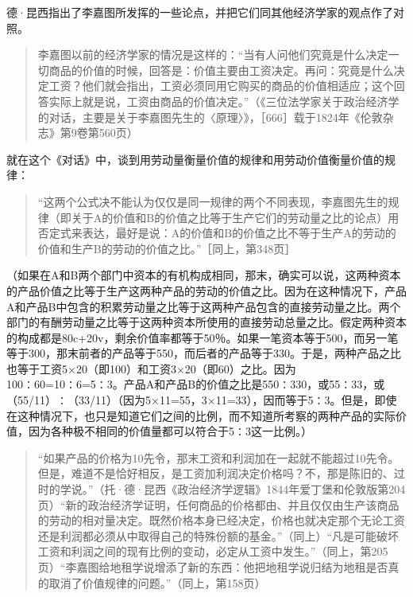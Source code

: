 
德·昆西指出了李嘉图所发挥的一些论点，并把它们同其他经济学家的观点作了对照。

\begin{quote}{李嘉图以前的经济学家的情况是这样的：“当有人问他们究竟是什么决定一切商品的价值的时候，回答是：价值主要由工资决定。再问：究竟是什么决定工资？他们就会指出，工资必须同用它购买的商品的价值相适应；这个回答实际上就是说，工资由商品的价值决定。”（《三位法学家关于政治经济学的对话，主要是关于李嘉图先生的〈原理〉》，［666］载于1824年《伦敦杂志》第9卷第560页）}\end{quote}

就在这个《对话》中，谈到用劳动量衡量价值的规律和用劳动价值衡量价值的规律：

\begin{quote}{“这两个公式决不能认为仅仅是同一规律的两个不同表现，李嘉图先生的规律（即关于A的价值和B的价值之比等于生产它们的劳动量之比的论点）用否定式来表达，最好是说：A的价值和B的价值之比不等于生产A的劳动的价值和生产B的劳动的价值之比。”［同上，第348页］}\end{quote}

（如果在A和B两个部门中资本的有机构成相同，那末，确实可以说，这两种资本的产品价值之比等于生产这两种产品的劳动的价值之比。因为在这种情况下，产品A和产品B中包含的积累劳动量之比等于这两种产品包含的直接劳动量之比。两个部门的有酬劳动量之比等于这两种资本所使用的直接劳动总量之比。假定两种资本的构成都是80c+20v，剩余价值率都等于50％。如果一笔资本等于500，而另一笔等于300，那末前者的产品等于550，而后者的产品等于330。于是，两种产品之比也等于工资5×20（即100）和工资3×20（即60）之比。因为100∶60=10∶6=5∶3。产品A和产品B的价值之比是550∶330，或55∶33，或（55/11）∶（33/11）（因为5×11=55，3×11=33），因而等于5∶3。但是，即使在这种情况下，也只是知道它们之间的比例，而不知道所考察的两种产品的实际价值，因为各种极不相同的价值量都可以符合于5∶3这一比例。）

\begin{quote}{“如果产品的价格为10先令，那末工资和利润加在一起就不能超过10先令。但是，难道不是恰好相反，是工资加利润决定价格吗？不，那是陈旧的、过时的学说。”（托·德·昆西《政治经济学逻辑》1844年爱丁堡和伦敦版第204页）“新的政治经济学证明，任何商品的价格都由、并且仅仅由生产该商品的劳动的相对量决定。既然价格本身已经决定，价格也就决定那个无论工资还是利润都必须从中取得自己的特殊份额的基金。”（同上）“凡是可能破坏工资和利润之间的现有比例的变动，必定从工资中发生。”（同上，第205页）“李嘉图给地租学说增添了新的东西：他把地租学说归结为地租是否真的取消了价值规律的问题。”（同上，第158页）}\end{quote}

